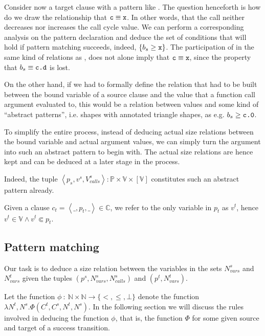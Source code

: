 Consider now a target clause with a pattern like . The question
henceforth is how do we draw the relationship that $\text{{\ttfamily c}}\equiv\text{{\ttfamily x}}$.
In other words, that the call neither decreases nor increases the call cycle
value. We can perform a corresponding analysis on the pattern declaration and
deduce the set of conditions that will hold if pattern matching succeeds,
indeed, $\{b_s\geq \text{{\ttfamily x}}\}$. The participation of  in the same kind
of relations as , does not alone imply that $\text{{\ttfamily c}}\equiv\text{{\ttfamily x}}$,
since the property that $b_s\equiv\text{{\ttfamily c.d}}$ is lost.

On the other hand, if we had to formally define the relation that had to be
built between the bound variable of a source clause and the value that a
function call argument evaluated to, this would be a relation between values
and some kind of ``abstract patterns'', i.e. shapes with annotated triangle
shapes, as e.g. $b_s\geq\text{{\ttfamily c.0}}$.

To simplify the entire process, instead of deducing actual size relations
between the bound variable and actual argument values, we can simply turn the
argument into such an abstract pattern to begin with. The actual size relations
are hence kept and can be deduced at a later stage in the process.

Indeed, the tuple $\left\langle p_s,v^s,V_{calls}^s \right\rangle : \mathbb{P}
\times \mathbb{V} \times [\mathbb{V}]$ constitutes such an abstract pattern
already.

\begin{definition} Given a clause $c_t=\left\langle \_,p_t,\_  \right\rangle
\in \mathbb{C}$, we refer to the only variable in $p_t$ as $v^t$, hence
$v^t\in\mathbb{V} \wedge v^t\Subset p_t$.\end{definition}

\subsection{Pattern matching}

Our task is to deduce a size relation between the variables in the sets
$N_{vars}^s$ and $N_{vars}^t$ given the tuples $(p^s,N_{vars}^s,N_{calls}^s)$
and $(p^t,N_{vars}^t)$.


Let the function $\phi\ :\ \mathbb{N} \times \mathbb{N} \rightarrow
\{<,\leq,\bot\}$ denote the function $\lambda N^t, N^s .
\Phi\left(C^t,C^s,N^t,N^s\right)$. In the following section we will discuss the
rules involved in deducing the function $\phi$, that is, the function $\Phi$
for some given source and target of a success transition.


